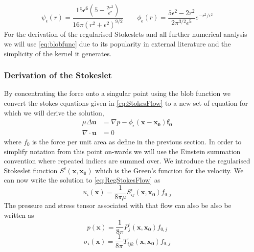 \begin{equation}
\label{eq:blobfunc2}
    \psi_{\epsilon}(r)=\frac{15 \epsilon^{6}\left(5-\frac{2 r^{2}}{\epsilon^{2}}\right)}{16 \pi\left(r^{2}+\epsilon^{2}\right)^{9 / 2}} \quad\quad \phi_{\epsilon}(r)=\frac{5 \epsilon^{2}-2 r^{2}}{2 \pi^{3 / 2} \epsilon^{5}} e^{-r^{2} / \epsilon^{2}}
\end{equation}
For the derivation of the regularised Stokeslets and all further numerical analysis we will use \cref{eq:blobfunc} due to its popularity in external literature and the simplicity of the kernel it generates.

\subsubsection{Derivation of the Stokeslet}
By concentrating the force onto a singular point using the blob function we convert the stokes equations given in \cref{eq:StokesFlow} to a new set of equation for which we will derive the solution,
\begin{subequations}
\label{eq:RegStokesFlow}
\begin{align}
    \mu\Delta\boldsymbol{u} &= \nabla p - \phi_{\epsilon}(\mathbf{x}-\mathbf{x_0})\mathbf{f_0} \label{eq:RegStokesFlow1} \\ 
    \nabla \cdot \boldsymbol{u} &= 0 \label{eq:RegStokesFlow2}
\end{align}
\end{subequations}
where $f_0$ is the force per unit area as define in the previous section.
In order to simplify notation from this point on-wards we will use the Einstein summation convention where repeated indices are summed over. We introduce the regularised Stokeslet function $S^\epsilon(\mathbf{x},\mathbf{x_0})$ which is the Green's function for the velocity. We can now write the solution to \cref{eq:RegStokesFlow} as 
\begin{equation}
\label{eq:regvelsol}
    u_i(\mathbf{x}) = \frac{1}{8\pi\mu}S^\epsilon_{ij}(\mathbf{x},\mathbf{x_0})f_{0,j}
\end{equation}
The pressure and stress tensor associated with that flow can also be also be written as
\begin{equation}
\label{eq:regpressuresol}
    p(\mathbf{x}) = \frac{1}{8\pi}P^\epsilon_{j}(\mathbf{x},\mathbf{x_0})f_{0,j}
\end{equation}
\begin{equation}
\label{eq:regstresssol}
    \sigma_i(\mathbf{x}) = \frac{1}{8\pi}T^\epsilon_{ijk}(\mathbf{x},\mathbf{x_0})f_{0,j}
\end{equation}

